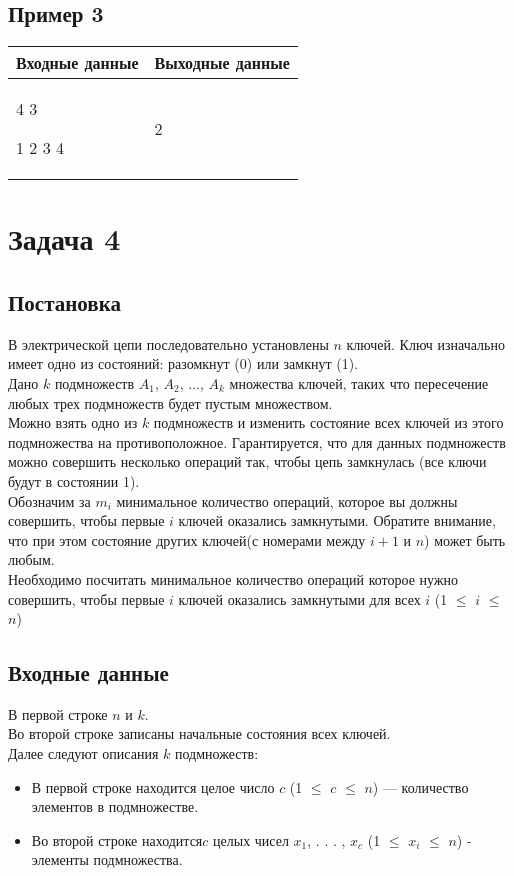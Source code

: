 \documentclass[a4]{article}
\begin{document}
\subsection*{Пример 3}
\label{sec:orge96f7c4}

\begin{table}[H]
\begin{center}
\begin{tabular}{|m{4cm}|m{4cm}|}
\hline
Входные данные & Выходные данные \\ \hline
4 3

1 2 3 4
&
2
\\ \hline
\end{tabular}
\end{center}
\end{table}

\pagebreak
\section*{Задача 4}
\label{sec:orgb1f46a6}
\subsection*{Постановка}
\label{sec:orge854c50}
В электрической цепи последовательно установлены \(n\) ключей. Ключ изначально имеет одно из
состояний: разомкнут (0) или замкнут (1).
\\
Дано \(k\) подмножеств \(A_1\), \(A_2\), ..., \(A_k\) множества ключей, таких что пересечение любых трех подмножеств будет пустым множеством.
\\
Можно взять одно из \(k\) подмножеств и изменить состояние всех ключей из этого подмножества на противоположное. Гарантируется, что для данных подмножеств можно совершить несколько операций так, чтобы цепь замкнулась (все ключи будут в состоянии 1).
\\
Обозначим за \(m_i\) минимальное количество операций, которое вы должны совершить,
чтобы первые \(i\) ключей оказались замкнутыми. Обратите внимание, что при этом состояние
других ключей(с номерами между \(i+1\) и \(n\)) может быть любым.\\
Необходимо посчитать минимальное количество операций которое нужно совершить,
чтобы первые \(i\) ключей оказались замкнутыми для всех \(i\) (1 $\leq$ \(i\) $\leq$ \(n\))


\subsection*{Входные данные}
\label{sec:orge854c50}
В первой строке \(n\) и \(k\).
\\
Во второй строке записаны начальные состояния всех ключей.
\\
Далее следуют описания \(k\) подмножеств:
\\
\begin{itemize}
    \item В первой строке находится целое число \(c\) (1 $\leq$ \(c\) $\leq$ \(n\)) — количество элементов в
подмножестве.
    \item Во второй строке находится\(c\) целых чисел \(x_1\), . . . , \(x_c\) (1 $\leq$ \(x_i\) $\leq$ \(n\)) - элементы подмножества.
\end{itemize}
\end{document}
